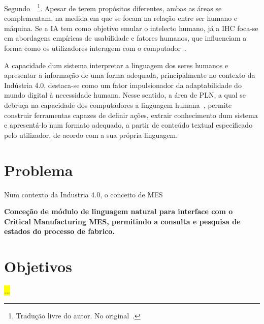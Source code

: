 Segundo~\textcite[p.1]{natural_language_translation_intersaction_ai_hci}~\footnote{Tradução livre do autor. No original~.}. Apesar de terem propósitos diferentes, ambas as áreas se complementam, na medida em que se focam na relação entre ser humano e máquina. Se a \gls{IA} tem como objetivo emular o intelecto humano, já a \gls{IHC} foca-se em abordagens empíricas de usabilidade e fatores humanos, que influenciam a forma como os utilizadores interagem com o computador~\parencite{natural_language_translation_intersaction_ai_hci}. 

A capacidade dum sistema interpretar a linguagem dos seres humanos e apresentar a informação de uma forma adequada, principalmente no contexto da Indústria 4.0, destaca-se como um fator impulsionador da adaptabilidade do mundo digital à necessidade humana. Nesse sentido, a área de \gls{PLN}, a qual se debruça na capacidade dos computadores  a linguagem humana~\parencite[p.1]{applied_natural_language_processing_with_python}, permite construir ferramentas capazes de definir ações, extrair conhecimento dum sistema e apresentá-lo num formato adequado, a partir de conteúdo textual especificado pelo utilizador, de acordo com a sua própria linguagem. 

\section{Problema} 
\label{sec:chap1_problem}

Num contexto da Industria 4.0, o conceito de \gls{MES}

\textbf{Conceção de módulo de linguagem natural para interface com o Critical Manufacturing MES, permitindo a consulta e pesquisa de estados do processo de fabrico.}

\section{Objetivos}
\label{sec:chap1_objectives}
\hl{...}

